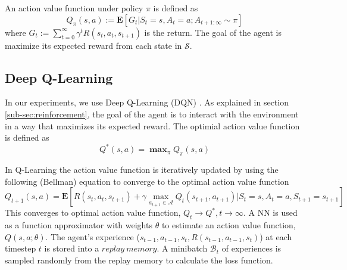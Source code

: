 \documentclass{article}
\newcommand{\cS}{\mathcal{S}}
\newcommand{\cA}{\mathcal{A}}
\newcommand{\cB}{\mathcal{B}}
\begin{document}
An action value function under policy $\pi$ is defined as
$$Q_\pi(s, a) := \mathbf{E}[G_t|S_t =s, A_t=a; A_{t+1: \infty} \sim \pi]$$
where $G_t := \sum_{t=0}^\infty \gamma^t R(s_t, a_t, s_{t+1})$ is the return.
The goal of the agent is maximize its expected reward from each state in $\cS$.

\subsection{Deep Q-Learning} \label{sub-sec:dqn}
In our experiments, we use Deep Q-Learning (DQN) \cite[]{mnih2013playing}.
As explained in section \ref{sub-sec:reinforcement}, the goal of the agent is to interact with the environment in a way that maximizes its expected reward.
The optimial action value function is defined as
$$Q^*(s, a) = \mathbf \max_{\pi} Q_\pi(s, a)$$

In Q-Learning the action value function is iteratively updated by using the following (Bellman) equation to converge to the optimal action value function
$$Q_{t+1}(s, a) = \mathbf{E}[R(s_t, a_t, s_{t+1}) + \gamma \max_{a_{t+1} \in \cA} Q_t(s_{t+1}, a_{t+1})|S_t =s, A_t=a, S_{t+1}=s_{t+1}]$$
This converges to optimal action value function, $Q_t \rightarrow Q^*, t \rightarrow \infty$.
A NN is used as a function approximator with weights $\theta$ to estimate an action value function, $Q(s, a; \theta)$.
The agent's experience ($s_{t-1}, a_{t-1}, s_t, R(s_{t-1}, a_{t-1}, s_t)$) at each timestep $t$ is stored into a $replay\ memory$.
A minibatch $\cB_t$ of experiences is sampled randomly from the replay memory to calculate the loss function.
\end{document}
